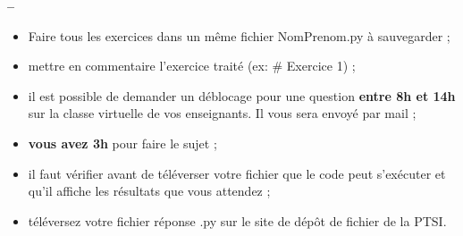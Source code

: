 





\begin{center}
{\Large\bf {\type} \no {\numero} -- \descrip}
\end{center}


\begin{boxedminipage}{.9\textwidth} 
\begin{itemize}
 \item Faire tous les exercices dans un même fichier {NomPrenom.py} à sauvegarder ;
 \item mettre en commentaire l'exercice traité (ex: \# Exercice 1) ;
 \item il est possible de demander un déblocage pour une question \textbf{entre 8h et 14h} sur la classe virtuelle de vos enseignants. Il vous sera envoyé par mail ;
  \item \textbf{vous avez 3h} pour faire le sujet ;
 \item il faut vérifier avant de téléverser votre fichier que le code peut s'exécuter et qu'il affiche les résultats que vous attendez ;
 \item téléversez votre fichier réponse .py sur le site de dépôt de fichier de la PTSI.
\end{itemize}
\end{boxedminipage}





